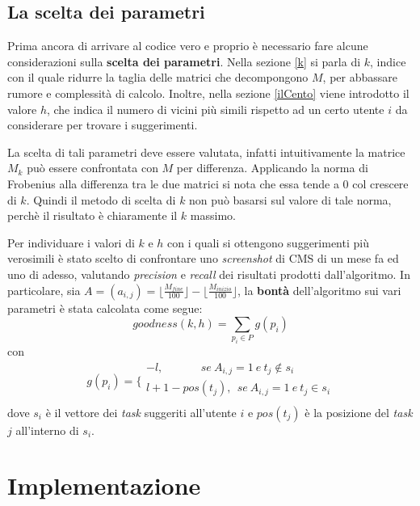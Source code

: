 \documentclass[12pt,a4paper]{article}
\theoremstyle{thm}
\theoremstyle{def}
\begin{document}

\subsection{La scelta dei parametri}
Prima ancora di arrivare al codice vero e proprio è necessario fare alcune considerazioni sulla \textbf{scelta dei parametri}. Nella sezione \ref{k} si parla di $k$, indice con il quale ridurre la taglia delle matrici che decompongono $M$, per abbassare rumore e complessità di calcolo. Inoltre, nella sezione \ref{ilCento} viene introdotto il valore $h$, che indica il numero di vicini più simili rispetto ad un certo utente $i$ da considerare per trovare i suggerimenti.

La scelta di tali parametri deve essere valutata, infatti intuitivamente la matrice $M_k$ può essere confrontata con $M$ per differenza. Applicando la norma di Frobenius alla differenza tra le due matrici si nota che essa tende a $0$ col crescere di $k$. Quindi il metodo di scelta di $k$ non può basarsi sul valore di tale norma, perchè il risultato è chiaramente il $k$ massimo.

Per individuare i valori di $k$ e $h$ con i quali si ottengono suggerimenti più verosimili è stato scelto di confrontare uno \textit{screenshot} di CMS di un mese fa ed uno di adesso, valutando \textit{precision} e \textit{recall} dei risultati prodotti dall'algoritmo. In particolare, sia $A = (a_{i, j}) = \biggl\lfloor \frac{M_{fine}}{100} \biggr\rfloor - \biggl\lfloor \frac{M_{inizio}}{100} \biggr\rfloor$, la \textbf{bontà} dell'algoritmo sui vari parametri è stata calcolata come segue:
\[
goodness(k, h) = \sum\limits_{p_i \in P}  g(p_i)
\]
con
\[
g(p_i) = \Biggl\{
		\begin{array}{ll}
			- l, ~~~~~~~~~~~~~~~se ~ A_{i, j} = 1 ~ e ~ t_j \not\in s_i\\
			l + 1 - pos(t_j), ~ ~ se ~ A_{i, j} = 1 ~ e ~ t_j \in s_i\\
		\end{array}
\]
dove $s_i$ è il vettore dei \textit{task} suggeriti all'utente $i$ e $pos(t_j)$ è la posizione del \textit{task} $j$ all'interno di $s_i$.

\section{Implementazione}
\end{document}
